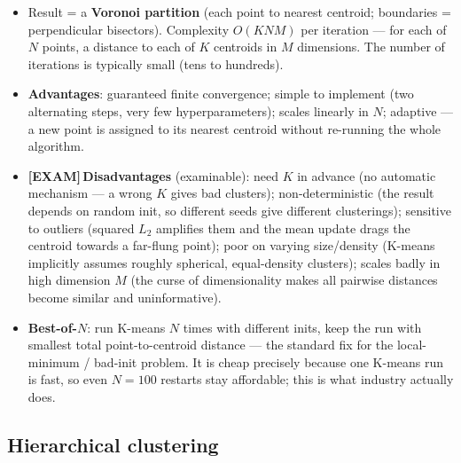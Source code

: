 \documentclass[11pt, a4paper]{article}
\newcommand{\examflag}{\textcolor{tipBd}{\textbf{[EXAM]}}\,}
\newcommand{\kw}[1]{\textbf{#1}}
\begin{document}
\begin{itemize}
  \item Result = a \kw{Voronoi partition} (each point to nearest centroid; boundaries = perpendicular
  bisectors). Complexity \kw{$O(KNM)$} per iteration — for each of $N$ points, a distance to each of
  $K$ centroids in $M$ dimensions. The number of iterations is typically small (tens to hundreds).
  \item \kw{Advantages}: guaranteed finite convergence; simple to implement (two alternating steps,
  very few hyperparameters); scales linearly in $N$; adaptive — a new point is assigned to its
  nearest centroid without re-running the whole algorithm.
  \item \examflag{}\kw{Disadvantages} (examinable): need $K$ in advance (no automatic mechanism — a
  wrong $K$ gives bad clusters); non-deterministic (the result depends on random init, so different
  seeds give different clusterings); sensitive to outliers (squared $L_2$ amplifies them and the
  mean update drags the centroid towards a far-flung point); poor on varying size/density (K-means
  implicitly assumes roughly spherical, equal-density clusters); scales badly in high dimension $M$
  (the curse of dimensionality makes all pairwise distances become similar and uninformative).
  \item \kw{Best-of-$N$}: run K-means $N$ times with different inits, keep the run with smallest
  total point-to-centroid distance — the standard fix for the local-minimum / bad-init problem. It
  is cheap precisely because one K-means run is fast, so even $N=100$ restarts stay affordable; this
  is what industry actually does.
\end{itemize}

\subsection{Hierarchical clustering}
\end{document}
